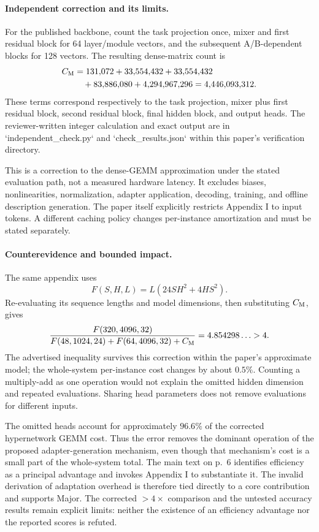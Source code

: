 \documentclass[10pt]{article}
\begin{document}
\paragraph*{Independent correction and its limits.}\mbox{}\par
For the published backbone, count the task projection once, mixer and first residual block for 64 layer/module vectors, and the subsequent A/B-dependent blocks for 128 vectors. The resulting dense-matrix count is \[\begin{aligned}
C_{\rm M}&=131{,}072+33{,}554{,}432+33{,}554{,}432\\
&\quad+83{,}886{,}080+4{,}294{,}967{,}296
=4{,}446{,}093{,}312.\nonumber\end{aligned}\] These terms correspond respectively to the task projection, mixer plus first residual block, second residual block, final hidden block, and output heads. The reviewer-written integer calculation and exact output are in `independent\_check.py` and `check\_results.json` within this paper’s verification directory.\par
This is a correction to the dense-GEMM approximation under the stated evaluation path, not a measured hardware latency. It excludes biases, nonlinearities, normalization, adapter application, decoding, training, and offline description generation. The paper itself explicitly restricts Appendix I to input tokens. A different caching policy changes per-instance amortization and must be stated separately.\par
\paragraph*{Counterevidence and bounded impact.}\mbox{}\par
The same appendix uses \[F(S,H,L)=L(24SH^2+4HS^2).\] Re-evaluating its sequence lengths and model dimensions, then substituting \(C_{\rm M}\), gives \[\frac{F(320,4096,32)}
 {F(48,1024,24)+F(64,4096,32)+C_{\rm M}}
=4.854298\ldots>4.\] The advertised inequality survives this correction within the paper’s approximate model; the whole-system per-instance cost changes by about \(0.5\%\). Counting a multiply-add as one operation would not explain the omitted hidden dimension and repeated evaluations. Sharing head parameters does not remove evaluations for different inputs.\par
The omitted heads account for approximately \(96.6\%\) of the corrected hypernetwork GEMM cost. Thus the error removes the dominant operation of the proposed adapter-generation mechanism, even though that mechanism’s cost is a small part of the whole-system total. The main text on p. 6 identifies efficiency as a principal advantage and invokes Appendix I to substantiate it. The invalid derivation of adaptation overhead is therefore tied directly to a core contribution and supports Major. The corrected \(>4\times\) comparison and the untested accuracy results remain explicit limits: neither the existence of an efficiency advantage nor the reported scores is refuted.\par
\end{document}
